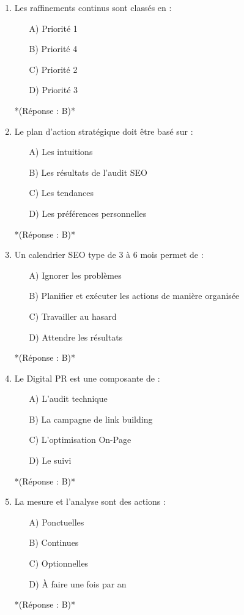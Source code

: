 \documentclass[12pt,a4paper,twoside]{report}
\begin{document}
\begin{enumerate}
    \item Les raffinements continus sont classés en :
    \begin{itemize}
        \item[A)] Priorité 1
        \item[B)] Priorité 4
        \item[C)] Priorité 2
        \item[D)] Priorité 3
    \end{itemize}
    *(Réponse : B)*

    \item Le plan d'action stratégique doit être basé sur :
    \begin{itemize}
        \item[A)] Les intuitions
        \item[B)] Les résultats de l'audit SEO
        \item[C)] Les tendances
        \item[D)] Les préférences personnelles
    \end{itemize}
    *(Réponse : B)*

    \item Un calendrier SEO type de 3 à 6 mois permet de :
    \begin{itemize}
        \item[A)] Ignorer les problèmes
        \item[B)] Planifier et exécuter les actions de manière organisée
        \item[C)] Travailler au hasard
        \item[D)] Attendre les résultats
    \end{itemize}
    *(Réponse : B)*

    \item Le Digital PR est une composante de :
    \begin{itemize}
        \item[A)] L'audit technique
        \item[B)] La campagne de link building
        \item[C)] L'optimisation On-Page
        \item[D)] Le suivi
    \end{itemize}
    *(Réponse : B)*

    \item La mesure et l'analyse sont des actions :
    \begin{itemize}
        \item[A)] Ponctuelles
        \item[B)] Continues
        \item[C)] Optionnelles
        \item[D)] À faire une fois par an
    \end{itemize}
    *(Réponse : B)*


\end{enumerate}
\end{document}
